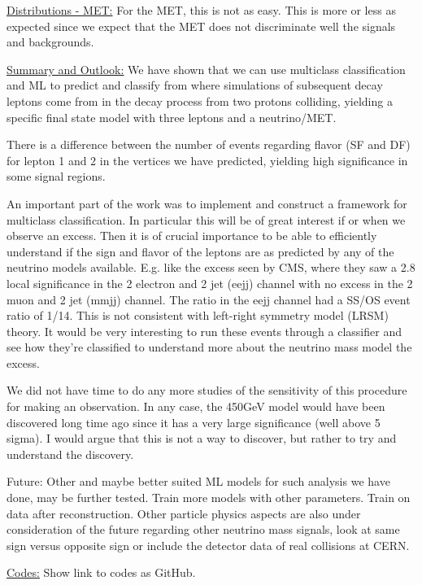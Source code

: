 \documentclass[a4paper, american, 12pt]{report}
\begin{document}
	
	\underline{Distributions - MET:}
	For the MET, this is not as easy. This is more or less as expected since we expect that the MET does not discriminate well the signals and backgrounds.
	
	
	\underline{Summary and Outlook:}
	We have shown that we can use multiclass classification and ML to predict and classify from where simulations of subsequent decay leptons come from in the decay process from two protons colliding, yielding a specific final state model with three leptons and a neutrino/MET.
	
	There is a difference between the number of events regarding flavor (SF and DF) for lepton 1 and 2 in the vertices we have predicted, yielding high significance in some signal regions. 
	
	An important part of the work was to implement and construct a framework for multiclass classification. In particular this will be of great interest if or when we observe an excess. Then it is of crucial importance to be able to efficiently understand if the sign and flavor of the leptons are as predicted by any of the neutrino models available. E.g. like the excess seen by CMS, where they saw a 2.8 local significance in the 2 electron and 2 jet (eejj) channel with no excess in the 2 muon and 2 jet (mmjj) channel.  The ratio in the eejj channel had a SS/OS event ratio of 1/14.  This is not consistent with left-right symmetry model (LRSM) theory. It would be very interesting to run these events through a classifier and see how they're classified to understand more about the neutrino mass model the excess. 
	
	We did not have time to do any more studies of the sensitivity of this procedure for making an observation. In any case, the 450GeV model would have been discovered long time ago since it has a very large significance (well above 5 sigma). I would argue that this is not a way to discover, but rather to try and understand the discovery.
	
	Future: Other and maybe better suited ML models for such analysis we have done, may be further tested. Train more models with other parameters. Train on data after reconstruction.
	Other particle physics aspects are also under consideration of the future regarding other neutrino mass signals, look at same sign versus opposite sign or include the detector data of real collisions at CERN.
	

	\underline{Codes:}
	Show link to codes as GitHub.	
\end{document}
